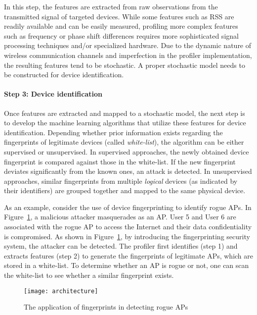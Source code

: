 \documentclass[journal,draftcls,onecolumn,11pt]{IEEEtran}
\begin{document}
In this step, the features are extracted from raw observations from the transmitted signal of targeted devices.  While some features such as RSS are readily available and can be easily measured, profiling more complex features such as frequency or phase shift differences requires more sophisticated signal processing techniques and/or specialized hardware.  Due to the dynamic nature of wireless communication channels and imperfection in the profiler implementation, the resulting features tend to be stochastic. A proper stochastic model needs to be constructed for device identification.

\paragraph*{Step 3: Device identification}

Once features are extracted and mapped to a stochastic model, the next step is to develop the machine learning algorithms that utilize these features for device identification. Depending whether prior information exists regarding the fingerprints of legitimate devices (called {\it white-list}), the algorithm can be either supervised or unsupervised. In supervised approaches, the newly obtained device fingerprint is compared against those in the white-list. If the new fingerprint deviates significantly from the known ones, an attack is detected. In unsupervised approaches, similar fingerprints from multiple {\it logical} devices (as indicated by their identifiers) are grouped together and mapped to the same physical device.

As an example, consider the use of device fingerprinting to identify rogue APs.  In Figure~\ref{fig:overview}, a malicious attacker masquerades as an AP. User 5 and User 6 are associated with the rogue AP to access the Internet and their data confidentiality is compromised.  As shown in Figure~\ref{fig:overview}, by introducing the fingerprinting security system, the attacker can be detected.  The profiler first identifies (step 1) and extracts features (step 2) to generate the fingerprints of legitimate APs, which are stored in a white-list. To determine whether an AP is rogue or not, one can scan the white-list to see whether a similar fingerprint exists.

\begin{figure}[t!]
\centering
\texttt{[image: architecture]}
\caption{The application of fingerprints in detecting rogue APs}
\label{fig:overview}
\end{figure}
\end{document}
